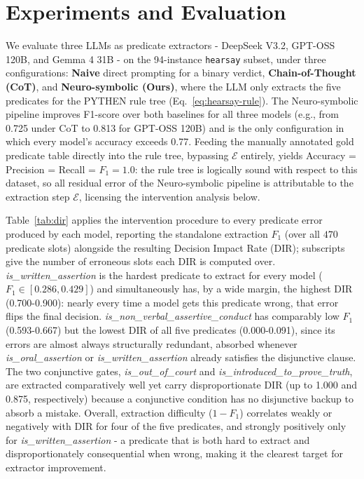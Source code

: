 \section{Experiments and Evaluation}
\label{sec:experiments}

We evaluate three LLMs as predicate extractors - DeepSeek V3.2, GPT-OSS 120B, and Gemma 4 31B - on the 94-instance \texttt{hearsay} subset, under three configurations: \textbf{Naive} direct prompting for a binary verdict, \textbf{Chain-of-Thought (CoT)}, and \textbf{Neuro-symbolic (Ours)}, where the LLM only extracts the five predicates for the PYTHEN rule tree (Eq.~\ref{eq:hearsay-rule}). The Neuro-symbolic pipeline improves F1-score over both baselines for all three models (e.g., from 0.725 under CoT to 0.813 for GPT-OSS 120B) and is the only configuration in which every model's accuracy exceeds 0.77. Feeding the manually annotated gold predicate table directly into the rule tree, bypassing $\mathcal{E}$ entirely, yields Accuracy = Precision = Recall = $F_1 = 1.0$: the rule tree is logically sound with respect to this dataset, so all residual error of the Neuro-symbolic pipeline is attributable to the extraction step $\mathcal{E}$, licensing the intervention analysis below.

Table~\ref{tab:dir} applies the intervention procedure to every predicate error produced by each model, reporting the standalone extraction $F_1$ (over all $470$ predicate slots) alongside the resulting Decision Impact Rate (DIR); subscripts give the number of erroneous slots each DIR is computed over. \textit{is\_written\_assertion} is the hardest predicate to extract for every model ($F_1 \in [0.286, 0.429]$) and simultaneously has, by a wide margin, the highest DIR (0.700-0.900): nearly every time a model gets this predicate wrong, that error flips the final decision. \textit{is\_non\_verbal\_assertive\_conduct} has comparably low $F_1$ (0.593-0.667) but the lowest DIR of all five predicates (0.000-0.091), since its errors are almost always structurally redundant, absorbed whenever \textit{is\_oral\_assertion} or \textit{is\_written\_assertion} already satisfies the disjunctive clause. The two conjunctive gates, \textit{is\_out\_of\_court} and \textit{is\_introduced\_to\_prove\_truth}, are extracted comparatively well yet carry disproportionate DIR (up to 1.000 and 0.875, respectively) because a conjunctive condition has no disjunctive backup to absorb a mistake. Overall, extraction difficulty ($1-F_1$) correlates weakly or negatively with DIR for four of the five predicates, and strongly positively only for \textit{is\_written\_assertion} - a predicate that is both hard to extract and disproportionately consequential when wrong, making it the clearest target for extractor improvement.

